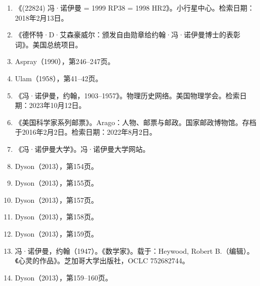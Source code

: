 \begin{enumerate}
\item 《(22824) 冯·诺伊曼 = 1999 RP38 = 1998 HR2》。小行星中心。检索日期：2018年2月13日。  
\item 《德怀特·D·艾森豪威尔：颁发自由勋章给约翰·冯·诺伊曼博士的表彰词》。美国总统项目。  
\item Aspray（1990），第246–247页。  
\item Ulam（1958），第41–42页。  
\item 《冯·诺伊曼，约翰，1903–1957》。物理历史网络。美国物理学会。检索日期：2023年10月12日。  
\item 《美国科学家系列邮票》。Arago：人物、邮票与邮政。国家邮政博物馆。存档于2016年2月2日。检索日期：2022年8月2日。  
\item 《冯·诺伊曼大学》。冯·诺伊曼大学网站。  
\item Dyson（2013），第154页。  
\item Dyson（2013），第155页。  
\item Dyson（2013），第157页。  
\item Dyson（2013），第158页。  
\item Dyson（2013），第159页。  
\item 冯·诺伊曼，约翰（1947）。《数学家》。载于：Heywood, Robert B.（编辑）。《心灵的作品》。芝加哥大学出版社，OCLC 752682744。  
\item Dyson（2013），第159–160页。
\end{enumerate}
